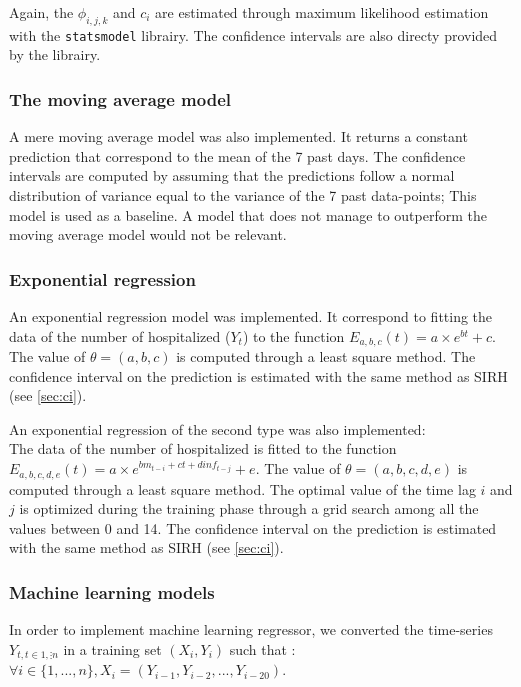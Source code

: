 Again, the $\phi_{i,j,k}$ and  $c_i$ are estimated through maximum likelihood estimation with the \texttt{statsmodel} librairy. 
The confidence intervals are also directy provided by the librairy.
\subsubsection{The moving average model}

A mere moving average model was also implemented. 
It returns a constant prediction that correspond to the mean of the 7 past days. 
The confidence intervals are computed by assuming that the predictions follow a normal distribution of variance equal to the variance of the 7 past data-points; 
This model is used as a baseline.
A model that does not manage to outperform the moving average model would not be relevant.

\subsubsection{Exponential regression}

An exponential regression model was implemented.
It correspond to fitting the data of the number of hospitalized ($Y_t$) to the function $E_{a, b, c}(t) = a \times e^{b t} +c$.
The value of $\theta = (a, b, c)$ is computed through a least square method.
The confidence interval on the prediction is estimated with the same method as SIRH (see \ref*{sec:ci}). 

An exponential regression of the second type was also implemented: \\
The data of the number of hospitalized is fitted to the function $E_{a, b, c, d, e}(t) = a \times e^{b m_{t-i} + c  t + d inf_{t-j} }+e$.
The value of $\theta = (a, b, c, d, e)$ is computed through a least square method.
The optimal value of the time lag $i$ and $j$ is optimized during the training phase through a grid search among all the values between 0 and 14. 
The confidence interval on the prediction is estimated with the same method as SIRH (see \ref*{sec:ci}). 

\subsubsection{Machine learning models}

In order to implement machine learning regressor, we converted the time-series $Y_{t, t \in {1, \vdots n}}$ in a training set $(X_i, Y_i)$ such that : \\
$\forall i \in \{1, ..., n\}, X_i = (Y_{i-1}, Y_{i-2}, ..., Y_{i-20})$.\\

